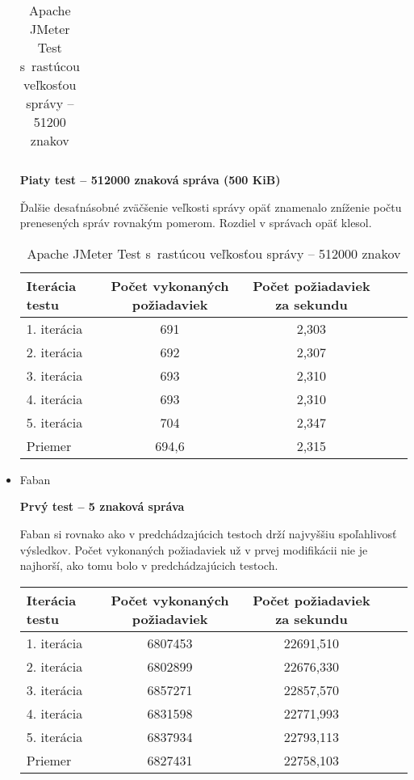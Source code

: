 \documentclass[12pt,oneside,final]{fithesis-utf8}
\begin{document}
\begin{itemize}
\begin{table}[H]
\begin{center}
\begin{tabular}{ | l | c | c | c | c |}
\end{tabular}
\end{center}
\caption{Apache JMeter Test s~rastúcou veľkosťou správy -- 51200 znakov}
\end{table}


\textbf{Piaty test -- 512000 znaková správa (500 KiB)}

Ďalšie desaťnásobné zväčšenie veľkosti správy opäť znamenalo zníženie počtu prenesených správ rovnakým pomerom. Rozdiel v správach opäť klesol.

\begin{table}[H]
\begin{center}
\begin{tabular}{ | l | c | c | c | c |}
		\hline
		 \textbf{Iterácia testu} & \textbf{Počet vykonaných požiadaviek} & \textbf{Počet požiadaviek za sekundu} \\ \hline
		 1. iterácia & 691 & 2,303 \\ \hline
		 2. iterácia & 692 & 2,307 \\ \hline
		 3. iterácia & 693 & 2,310 \\ \hline
		 4. iterácia & 693 & 2,310 \\ \hline
		 5. iterácia & 704 & 2,347 \\ \hline
		 Priemer & 694,6 & 2,315 \\ \hline
		 
\end{tabular}
\end{center}
\caption{Apache JMeter Test s~rastúcou veľkosťou správy -- 512000 znakov}
\end{table}

\item Faban

\textbf{Prvý test -- 5 znaková správa}

Faban si rovnako ako v predchádzajúcich testoch drží najvyššiu spoľahlivosť výsledkov. Počet vykonaných požiadaviek už v prvej modifikácii nie je najhorší, ako tomu bolo v predchádzajúcich testoch.

\begin{table}[H]
\begin{center}
\begin{tabular}{ | l | c | c | c | c |}
		\hline
		 \textbf{Iterácia testu} & \textbf{Počet vykonaných požiadaviek} & \textbf{Počet požiadaviek za sekundu} \\ \hline
		 1. iterácia & 6807453 & 22691,510 \\ \hline
		 2. iterácia & 6802899 & 22676,330 \\ \hline
		 3. iterácia & 6857271 & 22857,570 \\ \hline
		 4. iterácia & 6831598 & 22771,993 \\ \hline
		 5. iterácia & 6837934 & 22793,113 \\ \hline
		 Priemer & 6827431 & 22758,103 \\ \hline
		 

\end{tabular}
\end{center}
\end{table}
\end{itemize}
\end{document}
